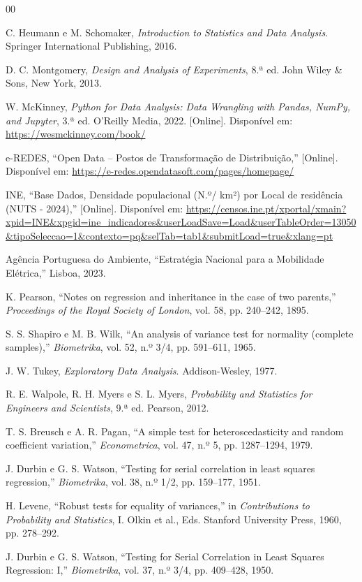 \documentclass[conference]{IEEEtran}
\begin{document}
\begin{thebibliography}{00}

C. Heumann e M. Schomaker, \textit{Introduction to Statistics and Data Analysis}. Springer International Publishing, 2016.

D. C. Montgomery, \textit{Design and Analysis of Experiments}, 8.ª ed. John Wiley \& Sons, New York, 2013.

W. McKinney, \textit{Python for Data Analysis: Data Wrangling with Pandas, NumPy, and Jupyter}, 3.ª ed. O'Reilly Media, 2022. [Online]. Disponível em: \url{https://wesmckinney.com/book/}

e-REDES, ``Open Data -- Postos de Transformação de Distribuição,'' [Online]. Disponível em: \url{https://e-redes.opendatasoft.com/pages/homepage/}

INE, ``Base Dados, Densidade populacional (N.º/ km²) por Local de residência (NUTS - 2024),'' [Online]. Disponível em: \url{https://censos.ine.pt/xportal/xmain?xpid=INE&xpgid=ine_indicadores&userLoadSave=Load&userTableOrder=13050&tipoSeleccao=1&contexto=pq&selTab=tab1&submitLoad=true&xlang=pt}

Agência Portuguesa do Ambiente, ``Estratégia Nacional para a Mobilidade Elétrica,'' Lisboa, 2023.

K. Pearson, ``Notes on regression and inheritance in the case of two parents,'' \textit{Proceedings of the Royal Society of London}, vol. 58, pp. 240--242, 1895.

S. S. Shapiro e M. B. Wilk, ``An analysis of variance test for normality (complete samples),'' \textit{Biometrika}, vol. 52, n.º 3/4, pp. 591--611, 1965.

J. W. Tukey, \textit{Exploratory Data Analysis}. Addison-Wesley, 1977.

R. E. Walpole, R. H. Myers e S. L. Myers, \textit{Probability and Statistics for Engineers and Scientists}, 9.ª ed. Pearson, 2012.

T. S. Breusch e A. R. Pagan, ``A simple test for heteroscedasticity and random coefficient variation,'' \textit{Econometrica}, vol. 47, n.º 5, pp. 1287--1294, 1979.

J. Durbin e G. S. Watson, ``Testing for serial correlation in least squares regression,'' \textit{Biometrika}, vol. 38, n.º 1/2, pp. 159--177, 1951.

H. Levene, ``Robust tests for equality of variances,'' in \textit{Contributions to Probability and Statistics}, I. Olkin et al., Eds. Stanford University Press, 1960, pp. 278--292.

J. Durbin e G. S. Watson, ``Testing for Serial Correlation in Least Squares Regression: I,'' \textit{Biometrika}, vol. 37, n.º 3/4, pp. 409--428, 1950.

\end{thebibliography}
\end{document}
